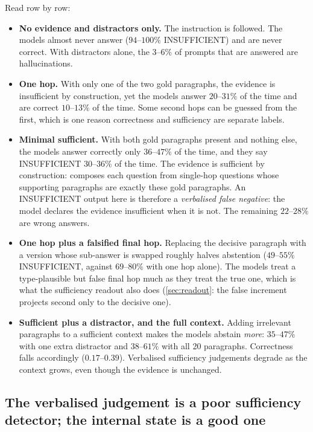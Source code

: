 Read row by row:
\begin{itemize}
  \item \textbf{No evidence and distractors only.} The instruction is followed. The models almost never answer ($94$--$100\%$ INSUFFICIENT) and are never correct. With distractors alone, the $3$--$6\%$ of prompts that are answered are hallucinations.
  \item \textbf{One hop.} With only one of the two gold paragraphs, the evidence is insufficient by construction, yet the models answer $20$--$31\%$ of the time and are correct $10$--$13\%$ of the time. Some second hops can be guessed from the first, which is one reason correctness and sufficiency are separate labels.
  \item \textbf{Minimal sufficient.} With both gold paragraphs present and nothing else, the models answer correctly only $36$--$47\%$ of the time, and they say INSUFFICIENT $30$--$36\%$ of the time. The evidence is sufficient by construction: \musique{} composes each question from single-hop questions whose supporting paragraphs are exactly these gold paragraphs. An INSUFFICIENT output here is therefore a \emph{verbalised false negative}: the model declares the evidence insufficient when it is not. The remaining $22$--$28\%$ are wrong answers.
  \item \textbf{One hop plus a falsified final hop.} Replacing the decisive paragraph with a version whose sub-answer is swapped roughly halves abstention ($49$--$55\%$ INSUFFICIENT, against $69$--$80\%$ with one hop alone). The models treat a type-plausible but false final hop much as they treat the true one, which is what the sufficiency readout also does (\cref{sec:readout}: the false increment projects second only to the decisive one).
  \item \textbf{Sufficient plus a distractor, and the full context.} Adding irrelevant paragraphs to a sufficient context makes the models abstain \emph{more}: $35$--$47\%$ with one extra distractor and $38$--$61\%$ with all 20 paragraphs. Correctness falls accordingly ($0.17$--$0.39$). Verbalised sufficiency judgements degrade as the context grows, even though the evidence is unchanged.
\end{itemize}

\subsection{The verbalised judgement is a poor sufficiency detector; the internal state is a good one}

